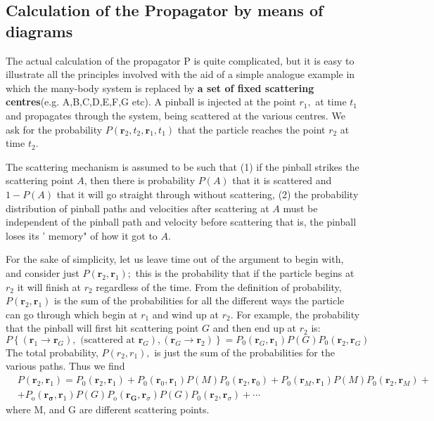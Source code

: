 \subsection{Calculation of the Propagator by means of diagrams}
The actual calculation of the propagator P is quite complicated, but it is easy to illustrate all the principles involved with the aid of a simple analogue example in which the many-body system is replaced by \textbf{a set of fixed scattering centres}(e.g. A,B,C,D,E,F,G etc). A pinball is injected at the point $r_{1},$ at time $t_{1}$ and propagates through the system, being scattered at the various centres. We ask for the probability $P\left(\mathbf{r}_{2}, t_{2}, \mathbf{r}_{1}, t_{1}\right)$ that the particle reaches the point $r_{2}$ at time $t_{2}$.

The scattering mechanism is assumed to be such that (1) if the pinball strikes the scattering point $A$, then there is probability $P(A)$ that it is scattered and $1-P(A)$ that it will go straight through without scattering, (2) the probability distribution of pinball paths and velocities after scattering
at $A$ must be independent of the pinball path and velocity before scattering that is, the pinball loses its ' memory" of how it got to $A$.

For the sake of simplicity, let us leave time out of the argument to begin with, and consider just $P\left(\mathbf{r}_{2}, \mathbf{r}_{1}\right) ;$ this is the probability that if the particle begins at $r_{2}$ it will finish at $r_{2}$ regardless of the time. From the definition of probability, $P\left(\mathbf{r}_{2}, \mathbf{r}_{1}\right)$ is the sum of the probabilities for all the different ways the particle can go through which begin at $r_{1}$ and wind up at $r_{2}$. For example, the probability that the pinball will first hit scattering point $G$ and then end up at $r_2$ is:
\begin{equation}\left.P\left\{\left(\mathbf{r}_{1} \rightarrow \mathbf{r}_{G}\right), \text { (scattered at } \mathbf{r}_{G}\right),\left(\mathbf{r}_{G} \rightarrow \mathbf{r}_{2}\right)\right\}=P_{0}\left(\boldsymbol{r}_{G}, \mathbf{r}_{1}\right) P(G) P_{0}\left(\mathbf{r}_{2}, \mathbf{r}_{G}\right)\end{equation}
The total probability, $P\left(r_{2}, r_{1}\right),$ is just the sum of the probabilities for the various paths. Thus we find
\begin{equation}\begin{aligned}
&P\left(\mathbf{r}_{2}, \mathbf{r}_{1}\right)=P_{0}\left(\mathbf{r}_{2}, \mathbf{r}_{1}\right)+P_{0}\left(\mathbf{r}_{0}, \mathbf{r}_{1}\right) P(M) P_{0}\left(\mathbf{r}_{2}, \mathbf{r}_{0}\right)+P_{0}\left(\mathbf{r}_{M}, \mathbf{r}_{1}\right) P(M) P_{0}\left(\mathbf{r}_{2}, \mathbf{r}_{M}\right)+\\
&+P_{\mathrm{o}}\left(\mathbf{r}_{\boldsymbol{\sigma}}, \mathbf{r}_{1}\right) P(G) P_{\mathrm{o}}\left(\mathbf{r}_{\boldsymbol{G}}, \mathbf{r}_{\sigma}\right) P(G) P_{0}\left(\mathbf{r}_{2}, \mathbf{r}_{\sigma}\right)+\cdots
\end{aligned}\end{equation}
where M, and G are different scattering points.

